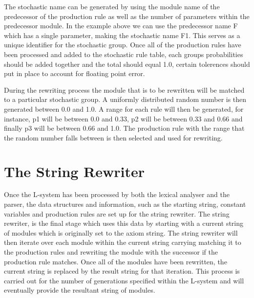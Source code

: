 \begin{flushleft}
\vspace{5mm}

The stochastic name can be generated by using the module name of the predecessor of the production rule as well as the number of parameters within the predecessor module. In the example above we can use the predecessor name F which has a single parameter, making the stochastic name F1. This serves as a unique identifier for the stochastic group. Once all of the production rules have been processed and added to the stochastic rule table, each groups probabilities should be added together and the total should equal 1.0, certain tolerences should put in place to account for floating point error. \\

\vspace{5mm}

During the rewriting process the module that is to be rewritten will be matched to a particular stochastic group. A uniformly distributed random number is then generated between 0.0 and 1.0. A range for each rule will then be generated, for instance, p1 will be between 0.0 and 0.33, p2 will be between 0.33 and 0.66 and finally p3 will be between 0.66 and 1.0. The production rule with the range that the random number falls between is then selected and used for rewriting. \\

\end{flushleft}

\section{The String Rewriter}

\begin{flushleft}

Once the L-system has been processed by both the lexical analyser and the parser, the data structures and information, such as the starting string, constant variables and production rules are set up for the string rewriter. The string rewriter, is the final stage which uses this data by starting with a current string of modules which is originally set to the axiom string. The string rewriter will then iterate over each module within the current string carrying matching it to the production rules and rewriting the module with the successor if the production rule matches. Once all of the modules have been rewritten, the current string is replaced by the result string for that iteration. This process is carried out for the number of generations specified within the L-system and will eventually provide the resultant string of modules.

\end{flushleft}

